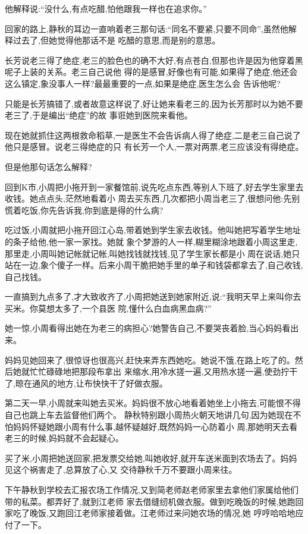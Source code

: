 ﻿\documentclass[12pt]{article}
\begin{document}
他解释说:``没什么,有点\myrule 吃醋,怕他跟我一样\myrule 也在\myrule 追求你。''

回家的路上,静秋的耳边一直响着老三那句话:``同名不要紧,只要不同命'',虽然他解释过去了,但她觉得他那话不是
吃醋的意思,而是\myrule 别的意思。

长芳说老三得了绝症,老三的脸色也的确不大好,有点苍白,但那也许是因为他穿着黑呢子上装的关系。老三自己说他
得的是感冒,好像也有可能,如果得了绝症,他还会这么镇定,象没事人一样?最最重要的一点,如果是绝症,医生怎么会
告诉他呢?

只能是长芳搞错了,或者故意这样说了,好让她来看老三的,因为长芳那时以为她不要老三了,于是编出``绝症''的故
事诳她到医院来看他。


现在她就抓住这两根救命稻草,一是医生不会告诉病人得了绝症,二是老三自己说了他只是感冒。说老三得绝症的只
有长芳一个人,一票对两票,老三应该没有得绝症。

但是他那句话怎么解释?

回到K市,小周把小拖开到一家餐馆前,说先吃点东西,等别人下班了,好去学生家里去收钱。她点点头,茫然地看着小
周去买东西,几次都把小周当老三了,很想问他:先别慌着吃饭,你先告诉我,你到底是得的什么病?

吃过饭,小周就把小拖开回江心岛,带着她到学生家去收钱。他叫她把写着学生地址的条子给他,他一家一家找。她就
象个梦游的人一样,糊里糊涂地跟着小周这里走,那里走,小周叫她记帐就记帐,叫她找钱就找钱,见了学生家长都是小
周在说话,她只站在一边,象个傻子一样。后来小周干脆把她手里的单子和钱袋都拿去了,自己收钱,自己找钱。

一直搞到九点多了,才大致收齐了,小周把她送到她家附近,说:``我明天早上来叫你去买米。你莫想太多了,一个县医
院,懂什么白血病黑血病?''

她一惊,小周看得出她在为老三的病担心?她警告自己,不要哭丧着脸,当心妈妈看出来。

妈妈见她回来了,很惊讶也很高兴,赶快来弄东西她吃。她说不饿,在路上吃了的。然后她就忙忙碌碌地把那段布拿出
来缩水,用冷水搓一遍,又用热水搓一遍,使劲拧干了,晾在通风的地方,让布快快干了好做衣服。

第二天一早,小周就来叫她去买米。妈妈很不放心地看着她坐上小拖去,可能恨不得自己也跳上车去监督他们两个。
静秋特别跟小周热火朝天地讲几句,因为她现在不怕妈妈怀疑她跟小周有什么事,越怀疑越好,既然妈妈一心防着小
周,那她明天去看老三的时候,妈妈就不会起疑心。

买了米,小周把她送回家,把发票交给她,叫她收好,就开车送米面到农场去了。妈妈见这个祸害走了,总算放了心,又
交待静秋千万不要跟小周来往。

下午静秋到学校去汇报农场工作情况,又到简老师赵老师家里去拿他们家属给他们带的私菜。都弄好了,就到江老师
家去借缝纫机做衣服。做到吃晚饭的时候,她跑回家吃了晚饭,又跑回江老师家接着做。江老师过来问她农场的情况,她
哼哼哈哈地应付了一下。
\end{document}
